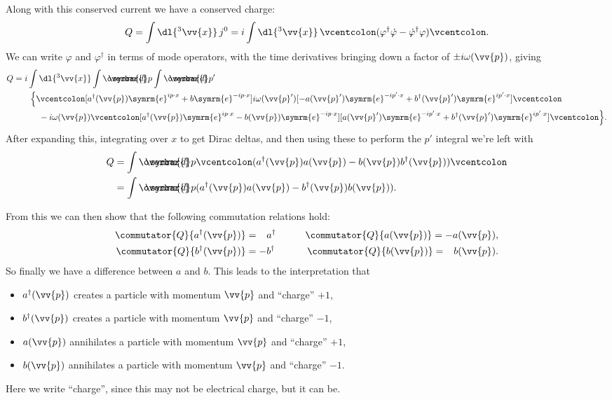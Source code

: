 \documentclass[fleqn]{NotesClass}
\newcommand{\e}{\symrm{e}}
\newcommand{\hermit}{{\dagger}}
\newcommand{\dbar}[1][0.0]{\ThisStyle{\ensurestackMath{%
            \stackengine{#1\LMex}{\SavedStyle \symrm{d}}{\SavedStyle\overbar{}%
                \mkern2.25mu}{O}{r}{F}{F}{L}}}}
\newcommand{\invariantmeasure}[1]{%
    \mathchoice{\dbar #1}{\dbar #1}{\dbar[.05] #1}{\dbar[.06] #1}
}
\newcommand{\normalordering}[1]{\mathopen{\vcentcolon}{#1}\mathclose{\vcentcolon}}
\begin{document}
    Along with this conserved current we have a conserved charge:
    \begin{equation}
        Q = \int \dl{^3\vv{x}} \, j^0 = i\int \dl{^3\vv{x}} \, \normalordering{(\varphi^\hermit \dot{\varphi} - \dot{\varphi}^\hermit \varphi)}.
    \end{equation}
    We can write \(\varphi\) and \(\varphi^\hermit\) in terms of mode operators, with the time derivatives bringing down a factor of \(\pm i\omega(\vv{p})\), giving
    \begin{align}
        Q &= i \int \dl{^3\vv{x}} \int \invariantmeasure{p} \int \invariantmeasure{p'}\\
        &\quad\quad \Big\{ \normalordering{[a^\hermit(\vv{p}) \e^{ip \cdot x} + b\e^{-ip \cdot x}]i\omega(\vv{p}')[-a(\vv{p}')\e^{-ip'\cdot x} + b^\hermit(\vv{p}')\e^{ip'\cdot x}]} \notag\\
        &\qquad\quad -i\omega(\vv{p})\normalordering{[a^\hermit(\vv{p})\e^{ip\cdot x} - b(\vv{p})\e^{-ip\cdot x}] [a(\vv{p}')\e^{-ip'\cdot x} + b^\hermit(\vv{p}')\e^{ip'\cdot x}]} \Big\}.\notag
    \end{align}
    After expanding this, integrating over \(x\) to get Dirac deltas, and then using these to perform the \(p'\) integral we're left with
    \begin{align}
        Q &= \int \invariantmeasure{p} \normalordering{(a^\hermit(\vv{p})a(\vv{p}) - b(\vv{p}) b^\hermit(\vv{p}))}\\
        &= \int \invariantmeasure{p} (a^\hermit(\vv{p}) a(\vv{p}) - b^\hermit(\vv{p})b(\vv{p})).
    \end{align}
    
    From this we can then show that the following commutation relations hold:
    \begin{alignat}{2}
        \commutator{Q}{a^\hermit(\vv{p})} &= \hphantom{-}a^\hermit \qquad & \commutator{Q}{a(\vv{p})} = -a(\vv{p}),\\
        \commutator{Q}{b^\hermit(\vv{p})} &= -b^\hermit \qquad & \commutator{Q}{b(\vv{p})} = \hphantom{-}b(\vv{p}).
    \end{alignat}
    So finally we have a difference between \(a\) and \(b\).
    This leads to the interpretation that
    \begin{itemize}
        \item \(a^\hermit(\vv{p})\) creates a particle with momentum \(\vv{p}\) and \enquote{charge} \(+1\),
        \item \(b^\hermit(\vv{p})\) creates a particle with momentum \(\vv{p}\) and \enquote{charge} \(-1\),
        \item \(a(\vv{p})\) annihilates a particle with momentum \(\vv{p}\) and \enquote{charge} \(+1\),
        \item \(b(\vv{p})\) annihilates a particle with momentum \(\vv{p}\) and \enquote{charge} \(-1\).
    \end{itemize}
    Here we write \enquote{charge}, since this may not be electrical charge, but it can be.
    
\end{document}
